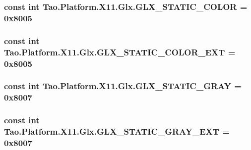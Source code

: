 \label{class_tao_1_1_platform_1_1_x11_1_1_glx_a6ace1cdea8ca8d0277262bbbdab3208e}
\hypertarget{class_tao_1_1_platform_1_1_x11_1_1_glx_a1303f2e0f2f13f0a1e5ffa33a22ea888}{
\subsubsection[{GLX\_\-STATIC\_\-COLOR}]{\setlength{\rightskip}{0pt plus 5cm}const int {\bf Tao.Platform.X11.Glx.GLX\_\-STATIC\_\-COLOR} = 0x8005}}
\label{class_tao_1_1_platform_1_1_x11_1_1_glx_a1303f2e0f2f13f0a1e5ffa33a22ea888}
\hypertarget{class_tao_1_1_platform_1_1_x11_1_1_glx_a1eab7def5d1f9ca7f7ca4ce75108a68e}{
\subsubsection[{GLX\_\-STATIC\_\-COLOR\_\-EXT}]{\setlength{\rightskip}{0pt plus 5cm}const int {\bf Tao.Platform.X11.Glx.GLX\_\-STATIC\_\-COLOR\_\-EXT} = 0x8005}}
\label{class_tao_1_1_platform_1_1_x11_1_1_glx_a1eab7def5d1f9ca7f7ca4ce75108a68e}
\hypertarget{class_tao_1_1_platform_1_1_x11_1_1_glx_a9eaa0fc788ced88feee6d0cbfc083c86}{
\subsubsection[{GLX\_\-STATIC\_\-GRAY}]{\setlength{\rightskip}{0pt plus 5cm}const int {\bf Tao.Platform.X11.Glx.GLX\_\-STATIC\_\-GRAY} = 0x8007}}
\label{class_tao_1_1_platform_1_1_x11_1_1_glx_a9eaa0fc788ced88feee6d0cbfc083c86}
\hypertarget{class_tao_1_1_platform_1_1_x11_1_1_glx_aba49bcbbff3a03176c368da11db5aaae}{
\subsubsection[{GLX\_\-STATIC\_\-GRAY\_\-EXT}]{\setlength{\rightskip}{0pt plus 5cm}const int {\bf Tao.Platform.X11.Glx.GLX\_\-STATIC\_\-GRAY\_\-EXT} = 0x8007}}
